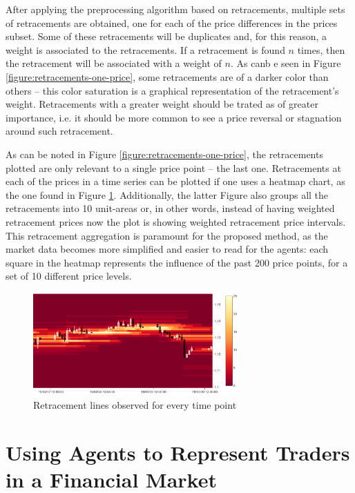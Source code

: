 After applying the preprocessing algorithm based on retracements, multiple sets
of retracements are obtained, one for each of the price differences in the
prices subset. Some of these retracements will be duplicates and, for this
reason, a weight is associated to the retracements. If a retracement is found
$n$ times, then the retracement will be associated with a weight of $n$. As canb
e seen in Figure \ref{figure:retracements-one-price}, some retracements are of a
darker color than others -- this color saturation is a graphical representation
of the retracement's weight. Retracements with a greater weight should be trated
as of greater importance, i.e. it should be more common to see a price reversal
or stagnation around such retracement.

As can be noted in Figure \ref{figure:retracements-one-price}, the retracements
plotted are only relevant to a single price point -- the last one. Retracements
at each of the prices in a time series can be plotted if one uses a heatmap
chart, as the one found in Figure
\ref{figure:retracements-all-prices}. Additionally, the latter Figure also
groups all the retracements into 10 unit-areas or, in other words, instead of
having weighted retracement prices now the plot is showing weighted retracement
price intervals. This retracement aggregation is paramount for the proposed
method, as the market data becomes more simplified and easier to read for the
agents: each square in the heatmap represents the influence of the past 200
price points, for a set of 10 different price levels.

\begin{figure}
\centering
\includegraphics[width=0.7\textwidth]{img/retracements-preprocessing-all-prices.png}
\caption{Retracement lines observed for every time point}
\label{figure:retracements-all-prices}
\end{figure}

\section{Using Agents to Represent Traders in a Financial Market}
\label{section:using-agents-to-represent-traders-in-a-financial-market}

